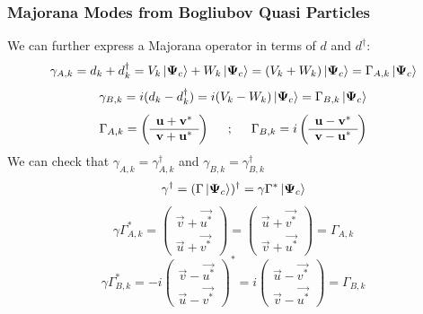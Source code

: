 \documentclass[Master]{subfiles}
\begin{document}
\subsubsection{Majorana Modes from Bogliubov Quasi Particles}\label{sec:BDGMajoranas}
We can further express a Majorana operator in terms of  $d$ and $d^{\dag}$:
\begin{equation}\label{math:BdG_MajTransf1}
\gamma_{A,k} = d_k+d^{\dag}_k = V_k \ket{\vec{\Psi}_c} + W_k \ket{\vec{\Psi}_c} = (V_k+W_k) \ket{\vec{\Psi}_c} = \Gamma_{A,k} \ket{\vec{\Psi}_c}
\end{equation}
\begin{equation}\label{math:BdG_MajTransf2}
\gamma_{B,k} = i(d_k-d^{\dag}_k) = i(V_k-W_k) \ket{\vec{\Psi}_c} = \Gamma_{B,k} \ket{\vec{\Psi}_c}
\end{equation}
$$
\Gamma_{A,k} = \left(
\begin{array}{c}
  \vec{u} + \vec{v^*}\\
   \hline 
   \vec{v} +\vec{u^*}
\end{array}\right) \hspace{.5cm} ;\hspace{.5cm} \Gamma_{B,k} = i
\left(
\begin{array}{c}
  \vec{u} - \vec{v^*}\\
   \hline 
   \vec{v} - \vec{u^*}
\end{array}\right)
$$
We can check that $\gamma_{A,k} = \gamma^{\dag}_{A,k}$ and $\gamma_{B,k} = \gamma^{\dag}_{B,k}$
$$
\gamma^{\dag} = (\Gamma \ket{\vec{\Psi}_c} )^{\dag} = \gamma \Gamma^* \ket{\vec{\Psi}_c} 
$$ 
$$
\gamma \Gamma_{A,k}^* = 
\left(
\begin{array}{c}
  \vec{v} +\vec{u^*}\\
   \hline 
   \vec{u} + \vec{v^*}
\end{array}\right) =
\left(
\begin{array}{c}
  \vec{u} + \vec{v^*}\\
   \hline 
   \vec{v} +\vec{u^*}
\end{array}\right)= \Gamma_{A,k} 
$$
$$\gamma \Gamma_{B,k}^* = -i
\left(
\begin{array}{c}
  \vec{v} - \vec{u^*}\\
   \hline 
   \vec{u} - \vec{v^*}
\end{array}\right)^*
=i
\left(
\begin{array}{c}
  \vec{u} - \vec{v^*}\\
   \hline 
   \vec{v} - \vec{u^*}
\end{array}\right) =  \Gamma_{B,k} 
$$
\end{document}
